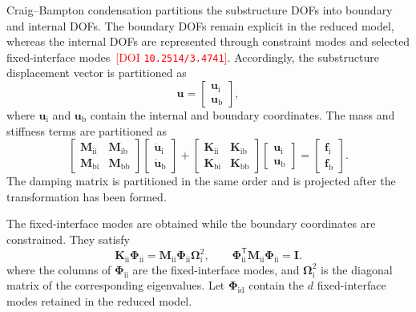 \documentclass[11pt,a4paper]{article}
\numberwithin{equation}{section}
\newcommand{\rev}[1]{\textcolor{red}{#1}}
\begin{document}
Craig--Bampton condensation partitions the substructure DOFs into boundary and internal DOFs. The boundary DOFs remain explicit in the reduced model, whereas the internal DOFs are represented through constraint modes and selected fixed-interface modes \cite{CraigBampton1968}\,\rev{[DOI \nolinkurl{10.2514/3.4741}]}. Accordingly, the substructure displacement vector is partitioned as
\begin{equation}
	\bm{u}=
	\begin{bmatrix}
		\bm{u}_{\mathrm{i}}\\
		\bm{u}_{\mathrm{b}}
	\end{bmatrix},
	\label{eq:cb-coordinate-order}
\end{equation}
where \(\bm{u}_{\mathrm{i}}\) and \(\bm{u}_{\mathrm{b}}\) contain the internal and boundary coordinates. The mass and stiffness terms are partitioned as
\begin{equation}
	\begin{bmatrix}
		\mathbf{M}_{\mathrm{ii}} & \mathbf{M}_{\mathrm{ib}}\\
		\mathbf{M}_{\mathrm{bi}} & \mathbf{M}_{\mathrm{bb}}
	\end{bmatrix}
	\begin{bmatrix}
		\ddot{\bm{u}}_{\mathrm{i}}\\
		\ddot{\bm{u}}_{\mathrm{b}}
	\end{bmatrix}
	+
	\begin{bmatrix}
		\mathbf{K}_{\mathrm{ii}} & \mathbf{K}_{\mathrm{ib}}\\
		\mathbf{K}_{\mathrm{bi}} & \mathbf{K}_{\mathrm{bb}}
	\end{bmatrix}
	\begin{bmatrix}
		\bm{u}_{\mathrm{i}}\\
		\bm{u}_{\mathrm{b}}
	\end{bmatrix}
	=
	\begin{bmatrix}
		\bm{f}_{\mathrm{i}}\\
		\bm{f}_{\mathrm{b}}
	\end{bmatrix}.
	\label{eq:cb-partitioned-eom}
\end{equation}
The damping matrix is partitioned in the same order and is projected after the transformation has been formed.

The fixed-interface modes are obtained while the boundary coordinates are constrained. They satisfy
\begin{equation}
	\mathbf{K}_{\mathrm{ii}}\bm{\Phi}_{\mathrm{ii}}
	=\mathbf{M}_{\mathrm{ii}}\bm{\Phi}_{\mathrm{ii}}\bm{\Omega}_{\mathrm{i}}^{2},
	\qquad
	\bm{\Phi}_{\mathrm{ii}}^{\mathsf{T}}\mathbf{M}_{\mathrm{ii}}\bm{\Phi}_{\mathrm{ii}}=\mathbf{I}.
	\label{eq:fixed-interface-modes}
\end{equation}
where the columns of \(\bm{\Phi}_{\mathrm{ii}}\) are the fixed-interface modes, and \(\bm{\Omega}_{\mathrm{i}}^{2}\) is the diagonal matrix of the corresponding eigenvalues. Let \(\bm{\Phi}_{\mathrm{id}}\) contain the \(d\) fixed-interface modes retained in the reduced model.
\end{document}
